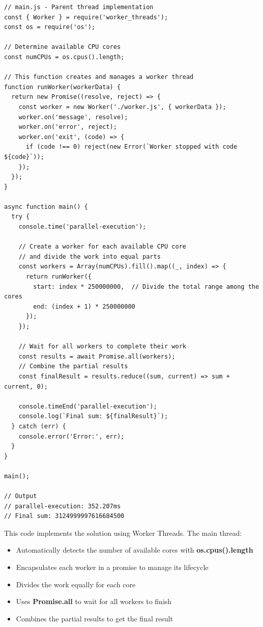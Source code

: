 \begin{macterminal}
\begin{lstlisting}
// main.js - Parent thread implementation
const { Worker } = require('worker_threads');
const os = require('os');

// Determine available CPU cores
const numCPUs = os.cpus().length;

// This function creates and manages a worker thread
function runWorker(workerData) {
  return new Promise((resolve, reject) => {
    const worker = new Worker('./worker.js', { workerData });
    worker.on('message', resolve);
    worker.on('error', reject);
    worker.on('exit', (code) => {
      if (code !== 0) reject(new Error(`Worker stopped with code ${code}`));
    });
  });
}

async function main() {
  try {
    console.time('parallel-execution');
    
    // Create a worker for each available CPU core
    // and divide the work into equal parts
    const workers = Array(numCPUs).fill().map((_, index) => {
      return runWorker({
        start: index * 250000000,  // Divide the total range among the cores
        end: (index + 1) * 250000000
      });
    });
    
    // Wait for all workers to complete their work
    const results = await Promise.all(workers);
    // Combine the partial results
    const finalResult = results.reduce((sum, current) => sum + current, 0);
    
    console.timeEnd('parallel-execution');
    console.log(`Final sum: ${finalResult}`);
  } catch (err) {
    console.error('Error:', err);
  }
}

main();

// Output
// parallel-execution: 352.207ms
// Final sum: 3124999997616684500
\end{lstlisting}
\end{macterminal}

This code implements the solution using Worker Threads. The main thread:
\begin{itemize}
    \item Automatically detects the number of available cores with \textbf{\textcolor{accentColor}{os.cpus().length}}
    \item Encapsulates each worker in a promise to manage its lifecycle
    \item Divides the work equally for each core
    \item Uses \textbf{\textcolor{accentColor}{Promise.all}} to wait for all workers to finish
    \item Combines the partial results to get the final result
\end{itemize}

